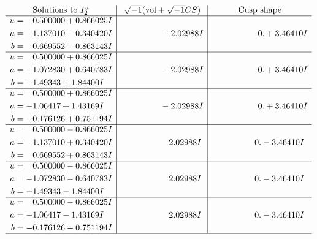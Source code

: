\documentclass[1p]{elsarticle_modified}
\theoremstyle{definition}
\newcommand{\I}{\sqrt{-1}}
\begin{document}
$$\begin{array}{c|c|c}  
\text{Solutions to }I^u_{2}& \I (\text{vol} + \sqrt{-1}CS) & \text{Cusp shape}\\
 \hline 
\begin{aligned}
u &= \phantom{-}0.500000 + 0.866025 I \\
a &= \phantom{-}1.137010 - 0.340420 I \\
b &= \phantom{-}0.669552 - 0.863143 I\end{aligned}
 & \phantom{-0.000000 } -2.02988 I & \phantom{-0.000000 -}0. + 3.46410 I \\ \hline\begin{aligned}
u &= \phantom{-}0.500000 + 0.866025 I \\
a &= -1.072830 + 0.640783 I \\
b &= -1.49343 + 1.84400 I\end{aligned}
 & \phantom{-0.000000 } -2.02988 I & \phantom{-0.000000 -}0. + 3.46410 I \\ \hline\begin{aligned}
u &= \phantom{-}0.500000 + 0.866025 I \\
a &= -1.06417 + 1.43169 I \\
b &= -0.176126 + 0.751194 I\end{aligned}
 & \phantom{-0.000000 } -2.02988 I & \phantom{-0.000000 -}0. + 3.46410 I \\ \hline\begin{aligned}
u &= \phantom{-}0.500000 - 0.866025 I \\
a &= \phantom{-}1.137010 + 0.340420 I \\
b &= \phantom{-}0.669552 + 0.863143 I\end{aligned}
 & \phantom{-0.000000 -}2.02988 I & \phantom{-0.000000 } 0. - 3.46410 I \\ \hline\begin{aligned}
u &= \phantom{-}0.500000 - 0.866025 I \\
a &= -1.072830 - 0.640783 I \\
b &= -1.49343 - 1.84400 I\end{aligned}
 & \phantom{-0.000000 -}2.02988 I & \phantom{-0.000000 } 0. - 3.46410 I \\ \hline\begin{aligned}
u &= \phantom{-}0.500000 - 0.866025 I \\
a &= -1.06417 - 1.43169 I \\
b &= -0.176126 - 0.751194 I\end{aligned}
 & \phantom{-0.000000 -}2.02988 I & \phantom{-0.000000 } 0. - 3.46410 I\\
 \hline 
 \end{array}$$\newpage\newpage\renewcommand{\arraystretch}{1}
\end{document}
